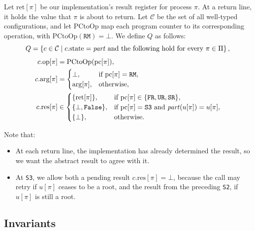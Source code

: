 \documentclass[12pt]{amsproc}
\begin{document}
Let $\mathrm{ret}[\pi]$ be our implementation's result register for process $\pi$. At a return line, it holds the value that $\pi$ is about to return. Let $\mathcal{C}$ be the set of all well-typed configurations, and let $\mathrm{PCtoOp}$ map each program counter to its corresponding operation, with $\mathrm{PCtoOp}(\texttt{RM})=\bot$. We define $Q$ as follows: 
\[
Q =
\left\{
c\in\mathcal{C}
\;\middle|\;
c.\mathrm{state}=\mathit{part}
\text{ and the following hold for every }\pi\in\Pi
\right\},
\]
\begin{align*}
c.\mathrm{op}[\pi]
    &= \mathrm{PCtoOp}(\mathrm{pc}[\pi]), \\
c.\mathrm{arg}[\pi]
    &= \begin{cases}
        \bot, & \text{if }\mathrm{pc}[\pi]=\texttt{RM}, \\
        \mathrm{arg}[\pi], & \text{otherwise},
       \end{cases} \\
c.\mathrm{res}[\pi]
    &\in \begin{cases}
        \{\mathrm{ret}[\pi]\},
            & \text{if }\mathrm{pc}[\pi]\in
                \{\texttt{FR},\texttt{UR},\texttt{SR}\}, \\
        \{\bot,\texttt{False{}}{}\},
            & \text{if }\mathrm{pc}[\pi]=\texttt{S3}
                \text{ and }\mathit{part}(u[\pi])=u[\pi], \\
        \{\bot\},
            & \text{otherwise}.
       \end{cases}
\end{align*}

Note that: 
\begin{itemize}
    \item At each return line, the implementation has already determined the result, so we want the abstract result to agree with it.
    \item At \texttt{S3}, we allow both a pending result $c.\mathrm{res}[\pi]=\bot$, because the call may retry if $u[\pi]$ ceases to be a root, and the result \False{} from the preceding \texttt{S2}, if $u[\pi]$ is still a root.
\end{itemize}



\subsection{Invariants}
\end{document}
